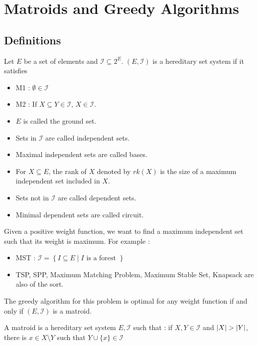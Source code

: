 \documentclass{cours}
\begin{document}
        \section{Matroids and Greedy Algorithms}
        \subsection{Definitions}
        \begin{definition}
            Let $E$ be a set of elements and $\mathcal{I} \subseteq 2^{E}$. $\left(E, \mathcal{I}\right)$ is a hereditary set system if it satisfies
            \begin{itemize}
                \item M1 : $\emptyset \in \mathcal{I}$
                \item M2 : If $X \subseteq Y \in \mathcal{I}$, $X \in \mathcal{I}$.
            \end{itemize}
            \begin{itemize}
                \item $E$ is called the ground set.
                \item Sets in $\mathcal{I}$ are called independent sets.
                \item Maximal independent sets are called bases.
                \item For $X \subseteq E$, the rank of $X$ denoted by $rk(X)$ is the size of a maximum independent set included in $X$.
                \item Sets not in $\mathcal{I}$ are called dependent sets.
                \item Minimal dependent sets are called circuit.
            \end{itemize}
        \end{definition}

        Given a positive weight function, we want to find a maximum independent set such that its weight is maximum. For example : 

            \begin{itemize}
                \item MST : $\mathcal{I} = \left\{I \subseteq E \mid I \text{ is a forest } \right\}$
                \item TSP, SPP, Maximum Matching Problem, Maximum Stable Set, Knapsack are also of the sort.
            \end{itemize}
  

        \begin{theorem}
            The greedy algorithm for this problem is optimal for any weight function if and only if $\left(E, \mathcal{I}\right)$ is a matroid.
        \end{theorem}

        \begin{definition}
            A matroid is a hereditary set system $E, \mathcal{I}$ such that : if $X, Y \in \mathcal{I}$ and $\left|X\right| > \left|Y\right|$, there is $x \in X \setminus Y$ such that $Y \cup \{x\} \in \mathcal{I}$
        \end{definition}
\end{document}
